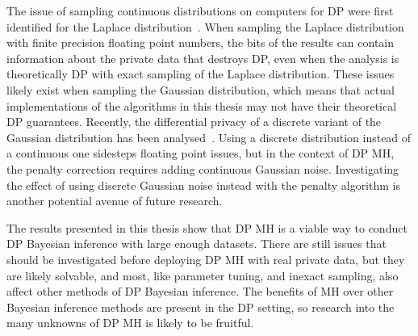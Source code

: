 \documentclass[english,twoside,openright]{HYgraduMLDS}
\begin{document}
The issue of sampling continuous distributions on computers for DP were first
identified for the Laplace distribution~\cite{Mir12}. When sampling the Laplace
distribution with finite precision floating point numbers, the bits of the
results can contain information about the private data that destroys DP, even
when the analysis is theoretically DP with exact sampling of the Laplace
distribution. These issues likely exist when sampling the Gaussian distribution,
which means that actual implementations of the algorithms in this thesis may
not have their theoretical DP guarantees. Recently, the differential privacy
of a discrete variant of the Gaussian distribution has been
analysed~\cite{C0S20}. Using a discrete distribution instead of a continuous one
sidesteps floating point issues, but in the context of DP MH, the penalty
correction requires adding continuous Gaussian noise. Investigating the effect
of using discrete Gaussian noise instead with the penalty algorithm is another
potential avenue of future research.

The results presented in this thesis show that DP MH is a viable way to
conduct DP Bayesian inference with large enough datasets. There are still
issues that should be investigated before deploying DP MH with real
private data, but they are likely solvable, and most, like parameter tuning,
and inexact sampling, also affect other methods of DP Bayesian inference.
The benefits of MH over other Bayesian inference methods are present in the
DP setting, so research into the many unknowns of DP MH is likely to be
fruitful.


\cleardoublepage %


\end{document}
